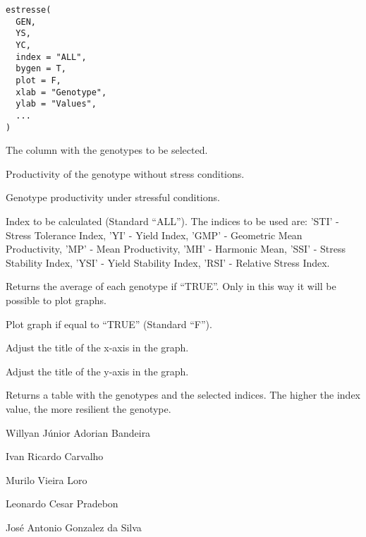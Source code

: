 \documentclass[a4paper]{book}
\begin{document}
%
\begin{Usage}
\begin{verbatim}
estresse(
  GEN,
  YS,
  YC,
  index = "ALL",
  bygen = T,
  plot = F,
  xlab = "Genotype",
  ylab = "Values",
  ...
)
\end{verbatim}
\end{Usage}
%
\begin{Arguments}
\begin{ldescription}
\item[\code{GEN}] The column with the genotypes to be selected.

\item[\code{YS}] Productivity of the genotype without stress conditions.

\item[\code{YC}] Genotype productivity under stressful conditions.

\item[\code{index}] Index to be calculated (Standard “ALL”). The indices to be used
are: 'STI' - Stress Tolerance Index, 'YI' - Yield Index, 'GMP' - Geometric Mean
Productivity, 'MP' - Mean Productivity, 'MH' - Harmonic Mean, 'SSI' - Stress
Stability Index, 'YSI' - Yield Stability Index, 'RSI' - Relative Stress Index.

\item[\code{bygen}] Returns the average of each genotype if “TRUE”. Only in this way
it will be possible to plot graphs.

\item[\code{plot}] Plot graph if equal to “TRUE” (Standard “F”).

\item[\code{xlab}] Adjust the title of the x-axis in the graph.

\item[\code{ylab}] Adjust the title of the y-axis in the graph.
\end{ldescription}
\end{Arguments}
%
\begin{Value}
Returns a table with the genotypes and the selected indices.
The higher the index value, the more resilient the genotype.
\end{Value}
%
\begin{Author}
Willyan Júnior Adorian Bandeira

Ivan Ricardo Carvalho

Murilo Vieira Loro

Leonardo Cesar Pradebon

José Antonio Gonzalez da Silva
\end{Author}
\end{document}
